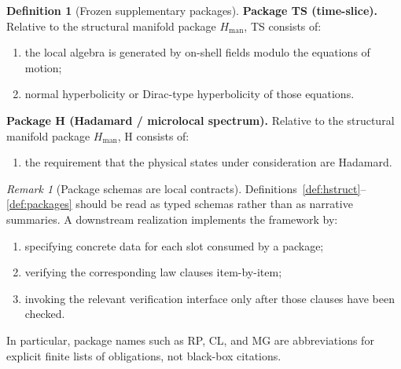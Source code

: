 \documentclass[12pt,a4paper]{article}
\theoremstyle{plain}
\theoremstyle{definition}
\newtheorem{definition}[theorem]{Definition}
\theoremstyle{remark}
\newtheorem{remark}[theorem]{Remark}
\begin{document}
\begin{definition}[Frozen supplementary packages]
  \medskip

  \noindent\textbf{Package TS (time-slice).}
  Relative to the structural manifold package $H_{\mathrm{man}}$,
  TS consists of:
  \begin{enumerate}[nosep,label=(TS\arabic*)]
  \item the local algebra is generated by on-shell fields modulo the
    equations of motion;
  \item normal hyperbolicity or Dirac-type hyperbolicity of those
    equations.
  \end{enumerate}

  \medskip

  \noindent\textbf{Package H (Hadamard / microlocal spectrum).}
  Relative to the structural manifold package $H_{\mathrm{man}}$,
  H consists of:
  \begin{enumerate}[nosep,label=(H\arabic*)]
  \item the requirement that the physical states under consideration
    are Hadamard.
  \end{enumerate}
\end{definition}

\begin{remark}[Package schemas are local contracts]
  Definitions~\ref{def:hstruct}--\ref{def:packages} should be read as typed
  schemas rather than as narrative summaries. A downstream realization
  implements the framework by:
\begin{enumerate}[nosep,label=(\roman*)]
\item specifying concrete data for each slot consumed by a package;
\item verifying the corresponding law clauses item-by-item;
\item invoking the relevant verification interface only after those clauses
  have been checked.
\end{enumerate}
  In particular, package names such as RP, CL, and MG are abbreviations for
  explicit finite lists of obligations, not black-box citations.
\end{remark}
\end{document}

